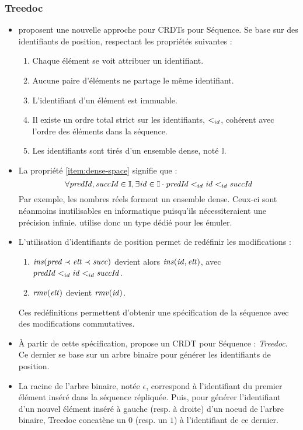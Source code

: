 \subsubsection{Treedoc}

\begin{itemize}
  \item \cite{2007-crdt-shapiro, 2009-treedoc-preguica} proposent une nouvelle approche pour CRDTs pour Séquence.
    Se base sur des identifiants de position, respectant les propriétés suivantes :
    \begin{enumerate}[label=(\roman*)]
      \item Chaque élément se voit attribuer un identifiant.
      \item \label{item:uniqueness} Aucune paire d'éléments ne partage le même identifiant.
      \item L'identifiant d'un élément est immuable.
      \item Il existe un ordre total strict sur les identifiants, $<_{id}$, cohérent avec l'ordre des éléments dans la séquence.
      \item \label{item:dense-space}
        Les identifiants sont tirés d'un ensemble dense, noté $\mathbb{I}$.
    \end{enumerate}
  \item La propriété \ref{item:dense-space} signifie que :
    \[\forall \mathit{predId}, \mathit{succId} \in \mathbb{I}, \exists \mathit{id} \in \mathbb{I} \cdot \mathit{predId} <_{id} \mathit{id} <_{id} \mathit{succId} \]
    Par exemple, les nombres réels forment un ensemble dense.
    Ceux-ci sont néanmoins inutilisables en informatique puisqu'ils nécessiteraient une précision infinie.
    \cite{2009-treedoc-preguica} utilise donc un type dédié pour les émuler.
  \item L'utilisation d'identifiants de position permet de redéfinir les modifications :
    \begin{enumerate}[label=(\roman*)]
      \item $\mathit{ins}(\mathit{pred} \prec \mathit{elt} \prec \mathit{succ})$ devient alors $\mathit{ins(\mathit{id}, \mathit{elt})}$, avec $\mathit{predId} <_{id} \mathit{id} <_{id} \mathit{succId}$.
      \item $\mathit{rmv}(\mathit{elt})$ devient $\mathit{rmv}(\mathit{id})$.
    \end{enumerate}
    Ces redéfinitions permettent d'obtenir une spécification de la séquence avec des modifications commutatives.
  \item À partir de cette spécification, \citeauthor{2009-treedoc-preguica} propose un CRDT pour Séquence : \emph{Treedoc}.
    Ce dernier se base sur un arbre binaire pour générer les identifiants de position.
  \item La racine de l'arbre binaire, notée $\epsilon$, correspond à l'identifiant du premier élément inséré dans la séquence répliquée.
    Puis, pour générer l'identifiant d'un nouvel élément inséré à gauche (resp. à droite) d'un noeud de l'arbre binaire, Treedoc concatène un $0$ (resp. un $1$) à l'identifiant de ce dernier.
    \begin{figure}[!ht]


\end{figure}
\end{itemize}
